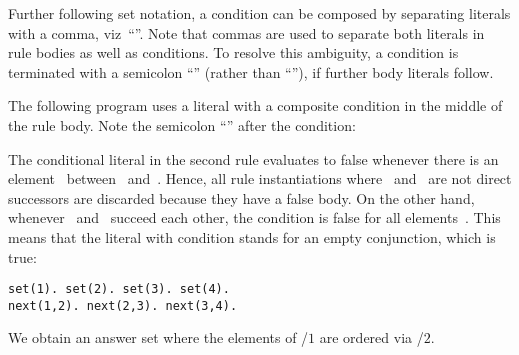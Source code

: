 Further following set notation,
a condition can be composed by separating literals with a comma, viz~``\code{,}''.
Note that commas are used to separate both literals in rule bodies as well as conditions.
To resolve this ambiguity,
a condition is terminated with a semicolon ``\code{;}'' (rather than ``\code{,}''), if further body literals follow.

\begin{example}\label{ex:sort}
The following program uses a literal with a composite condition in the middle of the rule body.
Note the semicolon ``\code{;}'' after the condition:
%

%
The conditional literal in the second rule evaluates to false
whenever there is an element~ between~ and~.
Hence, all rule instantiations where~ and~ are not direct successors are discarded
because they have a false body.
On the other hand, whenever~ and~ succeed each other,
the condition is false for all elements~.
This means that the literal with condition stands for an empty conjunction, which is true:%
%
\begin{lstlisting}[numbers=none]
set(1). set(2). set(3). set(4).
next(1,2). next(2,3). next(3,4).
\end{lstlisting}
We obtain an answer set where the elements of /$1$ are ordered via /$2$.
\eexample
\end{example}

